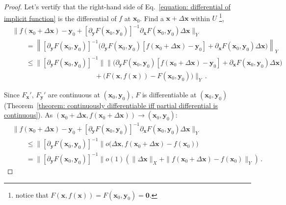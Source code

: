 \documentclass[openany]{book}
\theoremstyle{plain}
\theoremstyle{definition}
\newcommand*{\bv}{\boldsymbol} %
\begin{document}
\begin{proof}
	Let's vertify that the right-hand side of Eq.~\eqref{equation: differential of implicit function} is the differential of $f$ at $\bv x_0$. 
	Find a $\bv x + \Delta \bv x$ within $U$%
		\footnote{notice that $F(\bv x, f(\bv x)) = F(\bv x_0, \bv y_0) = \bv 0$.},
	\begin{align*}
		&\big\| f(\bv x_0 + \Delta \bv x) - \bv y_0 
		+ [\partial_{\bv y} F(\bv x_0, \bv y_0)]^{-1} \partial_{\bv x} F(\bv x_0, \bv y_0) 
			\Delta \bv x \big\|_Y
		\\&\qquad
		= \left\| [\partial_{\bv y} F(\bv x_0, \bv y_0)]^{-1}
			\big(
				\partial_{\bv y} F(\bv x_0, \bv y_0) [f(\bv x_0 + \Delta \bv x) - \bv y_0] 
				+ \partial_{\bv x} F(\bv x_0, \bv y_0) \Delta \bv x
			\big)
		\right\|_Y 
		\\&\qquad
		\leq  \| [\partial_{\bv y} F(\bv x_0, \bv y_0)]^{-1} \|
			\big\| \big(
				\partial_{\bv y} F(\bv x_0, \bv y_0) [f(\bv x_0 + \Delta \bv x) - \bv y_0] 
				+ \partial_{\bv x} F(\bv x_0, \bv y_0) \Delta \bv x
			\big) 
		\\&\qquad\qquad\qquad\qquad\qquad\qquad
			+ \big( F(\bv x, f(\bv x)) - F(\bv x_0, \bv y_0) \big)
			\big\|_Y\,.
	\end{align*}

	Since $F_{\bv x}'$, $F_{\bv y}'$ are continuous at $(\bv x_0, \bv y_0)$, $F$ is differentiable at $(\bv x_0, \bv y_0)$ (Theorem~\ref{theorem: continuously differentiable iff partial differential is continuous}).
	As $(\bv x_0 + \Delta \bv x, f(\bv x_0 + \Delta \bv x)) \to (\bv x_0, \bv y_0)$:
	\begin{align*}
		&\big\| f(\bv x_0 + \Delta \bv x) - \bv y_0 
		+ [\partial_{\bv y} F(\bv x_0, \bv y_0)]^{-1} \partial_{\bv x} F(\bv x_0, \bv y_0) 
			\Delta \bv x \big\|_Y
		\\&\qquad
		\leq \| [\partial_{\bv y} F(\bv x_0, \bv y_0)]^{-1} \|
		o\big(\Delta \bv x, f(\bv x_0 + \Delta \bv x) - f(\bv x_0) \big)
		\\&\qquad
		= \| [\partial_{\bv y} F(\bv x_0, \bv y_0)]^{-1} \| o(1) 
			(\|\Delta \bv x\|_X + \|f(\bv x_0 + \Delta \bv x) - f(\bv x_0)\|_Y)\,.
	\end{align*}


\end{proof}
\end{document}
